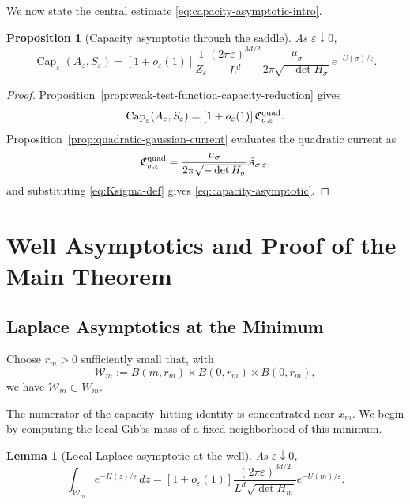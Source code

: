 \documentclass[11pt]{article}
\numberwithin{equation}{section}
\theoremstyle{plain}
\newtheorem{proposition}[theorem]{Proposition}
\newtheorem{lemma}[theorem]{Lemma}
\theoremstyle{definition}
\theoremstyle{remark}
\newcommand{\eps}{\varepsilon}
\renewcommand{\Cap}{\operatorname{Cap}}
\begin{document}
We now state the central estimate \eqref{eq:capacity-asymptotic-intro}.

\begin{proposition}[Capacity asymptotic through the saddle]
\label{prop:capacity-asymptotic}
As $\eps\downarrow0$,
\begin{equation}
\label{eq:capacity-asymptotic}
\Cap_\eps(A_\eps,S_\eps)
=
[1+o_\eps(1)]
\frac{1}{Z_\eps}
\frac{(2\pi\eps)^{3d/2}}{L^d}
\frac{\mu_\sigma}{2\pi\sqrt{-\det H_\sigma}}
e^{-U(\sigma)/\eps}.
\end{equation}
\end{proposition}

\begin{proof}
Proposition~\ref{prop:weak-test-function-capacity-reduction} gives
\[
\Cap_\eps(A_\eps,S_\eps)
=\left[1+o_\eps(1)\right]
\mathfrak C_{\sigma,\eps}^{\rm quad}.
\]
Proposition~\ref{prop:quadratic-gaussian-current} evaluates the quadratic
current as
\[
\mathfrak C_{\sigma,\eps}^{\rm quad}
=\frac{\mu_\sigma}{2\pi\sqrt{-\det H_\sigma}}
\mathfrak K_{\sigma,\eps},
\]
and substituting \eqref{eq:Ksigma-def} gives
\eqref{eq:capacity-asymptotic}.
\end{proof}

\section{Well Asymptotics and Proof of the Main Theorem}
\label{sec:well-proof}

\subsection{Laplace Asymptotics at the Minimum}
\label{sec:laplace-min}

Choose $r_m>0$ sufficiently small that, with
\[
\mathcal W_m:=B(m,r_m)\times B(0,r_m)\times B(0,r_m),
\]
we have $\overline{\mathcal W_m}\subset W_m$.

The numerator of the capacity--hitting identity is concentrated
near $x_m$.  We begin by computing the local Gibbs mass of a fixed
neighborhood of this minimum.

\begin{lemma}[Local Laplace asymptotic at the well]
\label{lem:local-laplace-well}
As $\eps\downarrow0$,
\[
\int_{\mathcal W_m}e^{-H(z)/\eps}\,dz
=
[1+o_\eps(1)]
\frac{(2\pi\eps)^{3d/2}}{L^d\sqrt{\det H_m}}
e^{-U(m)/\eps}.
\]
\end{lemma}
\end{document}
